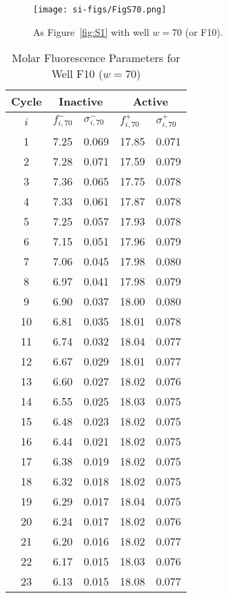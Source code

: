                 \begin{figure}
                    \centering
                    \texttt{[image: si-figs/FigS70.png]}
                    \caption{
                        As Figure~\ref{fig:S1} with well $w=70$ (or F10).
                    }
                \end{figure}
                \clearpage
    \begin{table}
        \caption{Molar Fluorescence Parameters for Well F10 ($w=70$)}
        \centering
        \begin{tabular}{c|ll|ll}
            Cycle & \multicolumn{2}{c|}{Inactive} & \multicolumn{2}{c}{Active} \\
            \hline
            $i$ & $f_{i,70}^{-}$ & $\sigma_{i,70}^{-}$ &  $f_{i,70}^{+}$ & $\sigma_{i,70}^{+}$ \\
            \hline
    1 & 7.25 & 0.069 & 17.85 & 0.071 \\
2 & 7.28 & 0.071 & 17.59 & 0.079 \\
3 & 7.36 & 0.065 & 17.75 & 0.078 \\
4 & 7.33 & 0.061 & 17.87 & 0.078 \\
5 & 7.25 & 0.057 & 17.93 & 0.078 \\
6 & 7.15 & 0.051 & 17.96 & 0.079 \\
7 & 7.06 & 0.045 & 17.98 & 0.080 \\
8 & 6.97 & 0.041 & 17.98 & 0.079 \\
9 & 6.90 & 0.037 & 18.00 & 0.080 \\
10 & 6.81 & 0.035 & 18.01 & 0.078 \\
11 & 6.74 & 0.032 & 18.04 & 0.077 \\
12 & 6.67 & 0.029 & 18.01 & 0.077 \\
13 & 6.60 & 0.027 & 18.02 & 0.076 \\
14 & 6.55 & 0.025 & 18.03 & 0.075 \\
15 & 6.48 & 0.023 & 18.02 & 0.075 \\
16 & 6.44 & 0.021 & 18.02 & 0.075 \\
17 & 6.38 & 0.019 & 18.02 & 0.075 \\
18 & 6.32 & 0.018 & 18.02 & 0.075 \\
19 & 6.29 & 0.017 & 18.04 & 0.075 \\
20 & 6.24 & 0.017 & 18.02 & 0.076 \\
21 & 6.20 & 0.016 & 18.02 & 0.077 \\
22 & 6.17 & 0.015 & 18.03 & 0.076 \\
23 & 6.13 & 0.015 & 18.08 & 0.077 \\

\end{tabular}
\end{table}
